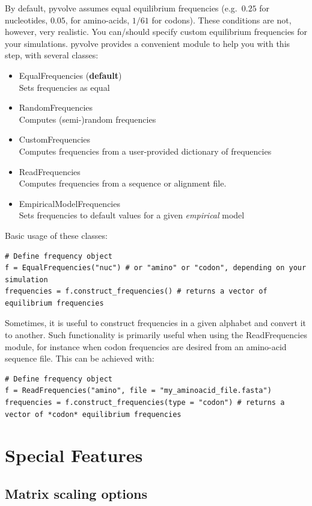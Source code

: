 \documentclass{article}
\begin{document}
By default, pyvolve assumes equal equilibrium frequencies (e.g.\ $0.25$ for nucleotides, $0.05$, for amino-acids, $1/61$ for codons). These conditions are not, however, very realistic. You can/should specify custom equilibrium frequencies for your simulations. pyvolve provides a convenient module to help you with this step, with several classes:
\begin{itemize}
	\item EqualFrequencies (\textbf{default}) \\ Sets frequencies as equal 
	\item RandomFrequencies \\ Computes (semi-)random frequencies
	\item CustomFrequencies \\ Computes frequencies from a user-provided dictionary of frequencies
	\item ReadFrequencies \\ Computes frequencies from a sequence or alignment file.
	\item EmpiricalModelFrequencies \\ Sets frequencies to default values for a given \emph{empirical} model		
\end{itemize}

Basic usage of these classes:
\begin{lstlisting}
# Define frequency object
f = EqualFrequencies("nuc") # or "amino" or "codon", depending on your simulation
frequencies = f.construct_frequencies() # returns a vector of equilibrium frequencies
\end{lstlisting}
 
Sometimes, it is useful to construct frequencies in a given alphabet and convert it to another. Such functionality is primarily useful when using the ReadFrequencies module, for instance when codon frequencies are desired from an amino-acid sequence file. This can be achieved with:
\begin{lstlisting}
# Define frequency object
f = ReadFrequencies("amino", file = "my_aminoacid_file.fasta")
frequencies = f.construct_frequencies(type = "codon") # returns a vector of *codon* equilibrium frequencies
\end{lstlisting}


\section{Special Features}\label{sec:special}

\subsection{Matrix scaling options}\label{sec:scaling}
\end{document}
